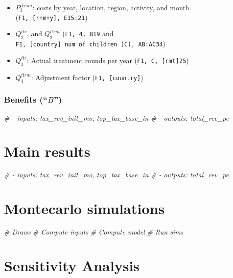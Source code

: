 \documentclass[]{article}
\newenvironment{Shaded}{\begin{snugshade}}{\end{snugshade}}
\newcommand{\CommentTok}[1]{\textcolor[rgb]{0.56,0.35,0.01}{\textit{#1}}}
\begin{document}
\begin{itemize}
\item
  \(P^{itram}_{3}\): costs by year, location, region, activity, and
  month. (\texttt{F1,\ {[}r+m+y{]},\ E15:21})
\item
  \(Q^{itr}_{2}\), and \(Q^{itrm}_{2}\) (\texttt{F1,\ 4,\ B19} and
  \texttt{F1,\ {[}country{]}\ num\ of\ children\ (C),\ AB:AC34})
\item
  \(Q^{itr}_{3}\): Actual treatment rounds per year
  (\texttt{F1,\ C,\ {[}rmt{]}25})
\item
  \(Q^{itrm}_{4}\): Adjustment factor (\texttt{F1,\ {[}country{]}})
\end{itemize}

\hypertarget{benefits-b}{%
\subsubsection{\texorpdfstring{Benefits
(``\(B\)'')}{Benefits (``B'')}}\label{benefits-b}}

\begin{Shaded}
\begin{Highlighting}[]
\CommentTok{# - inputs: tax_rev_init_mo, top_tax_base_in}
\CommentTok{# - outputs: total_rev_pe}
\end{Highlighting}
\end{Shaded}

\hypertarget{main-results}{%
\section{Main results}\label{main-results}}

\begin{Shaded}
\begin{Highlighting}[]
\CommentTok{# - inputs: tax_rev_init_mo, top_tax_base_in}
\CommentTok{# - outputs: total_rev_pe}
\end{Highlighting}
\end{Shaded}

\hypertarget{montecarlo-simulations}{%
\section{Montecarlo simulations}\label{montecarlo-simulations}}

\begin{Shaded}
\begin{Highlighting}[]
\CommentTok{# Draws}
\CommentTok{# Compute inputs}
\CommentTok{# Compute model}
\CommentTok{# Run sims}
\end{Highlighting}
\end{Shaded}

\hypertarget{sensitivity-analysis}{%
\section{Sensitivity Analysis}\label{sensitivity-analysis}}
\end{document}
